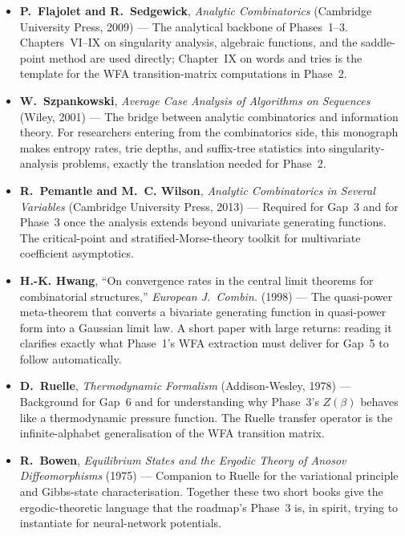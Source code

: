 \begin{itemize}
  \item \textbf{P.~Flajolet and R.~Sedgewick}, \emph{Analytic Combinatorics} (Cambridge University Press, 2009) \cite{FlajoletSedgewick2009} --- The analytical backbone of Phases~1--3. Chapters~VI--IX on singularity analysis, algebraic functions, and the saddle-point method are used directly; Chapter~IX on words and tries is the template for the WFA transition-matrix computations in Phase~2.

  \item \textbf{W.~Szpankowski}, \emph{Average Case Analysis of Algorithms on Sequences} (Wiley, 2001) \cite{Szpankowski2001} --- The bridge between analytic combinatorics and information theory. For researchers entering from the combinatorics side, this monograph makes entropy rates, trie depths, and suffix-tree statistics into singularity-analysis problems, exactly the translation needed for Phase~2.

  \item \textbf{R.~Pemantle and M.~C. Wilson}, \emph{Analytic Combinatorics in Several Variables} (Cambridge University Press, 2013) \cite{PemantleWilson2013} --- Required for Gap~3 and for Phase~3 once the analysis extends beyond univariate generating functions. The critical-point and stratified-Morse-theory toolkit for multivariate coefficient asymptotics.

  \item \textbf{H.-K. Hwang}, ``On convergence rates in the central limit theorems for combinatorial structures,'' \emph{European J.\ Combin.} (1998) \cite{Hwang1998} --- The quasi-power meta-theorem that converts a bivariate generating function in quasi-power form into a Gaussian limit law. A short paper with large returns: reading it clarifies exactly what Phase~1's WFA extraction must deliver for Gap~5 to follow automatically.

  \item \textbf{D.~Ruelle}, \emph{Thermodynamic Formalism} (Addison-Wesley, 1978) \cite{Ruelle1978} --- Background for Gap~6 and for understanding why Phase~3's $Z(\beta)$ behaves like a thermodynamic pressure function. The Ruelle transfer operator is the infinite-alphabet generalisation of the WFA transition matrix.

  \item \textbf{R.~Bowen}, \emph{Equilibrium States and the Ergodic Theory of Anosov Diffeomorphisms} (1975) \cite{Bowen1975} --- Companion to Ruelle for the variational principle and Gibbs-state characterisation. Together these two short books give the ergodic-theoretic language that the roadmap's Phase~3 is, in spirit, trying to instantiate for neural-network potentials.
\end{itemize}

